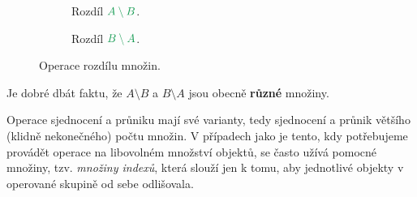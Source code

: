 \begin{itemize}
\begin{figure}[ht]
\begin{subfigure}{.3\textwidth}
    \caption{Rozdíl $\clg{A \setminus B}$.}
    \label{subfig:rozdil-b}
   \end{subfigure}
   \begin{subfigure}{.3\textwidth}
    \centering
    \caption{Rozdíl $\clg{B \setminus A}$.}
    \label{subfig:rozdil-c}
   \end{subfigure}
   \caption{Operace rozdílu množin.}
   \label{fig:rozdil}
  \end{figure}
  Je dobré dbát faktu, že $A \setminus B$ a $B \setminus A$ jsou obecně
  \textbf{různé} množiny.
\end{itemize}

Operace sjednocení a průniku mají své  varianty, tedy sjednocení a
průnik většího (klidně nekonečného) počtu množin. V případech jako je tento, kdy
potřebujeme provádět operace na libovolném množství objektů, se často užívá
pomocné množiny, tzv. \emph{množiny indexů}, která slouží jen k tomu, aby
jednotlivé objekty v operované skupině od sebe odlišovala.

